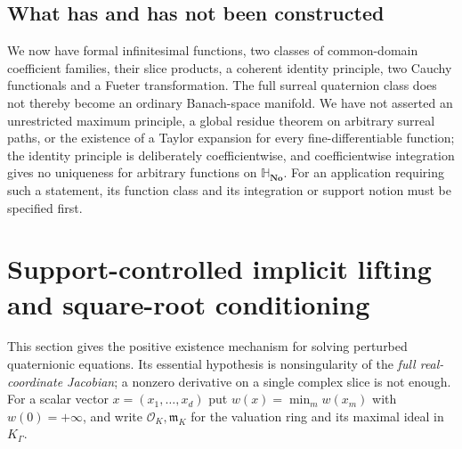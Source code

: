 \documentclass[11pt,letterpaper]{article}
\numberwithin{equation}{section}
\theoremstyle{definition}
\theoremstyle{remark}
\newcommand{\No}{\mathbf{No}}
\newcommand{\SQ}{\mathbb H_{\No}}
\newcommand{\OO}{\mathcal O}
\newcommand{\mm}{\mathfrak m}
\begin{document}
\subsection{What has and has not been constructed}\label{squat:sub:analysis-scope}
We now have formal infinitesimal functions, two classes of common-domain coefficient
families, their slice products, a coherent identity principle, two Cauchy functionals and a
Fueter transformation. The full surreal quaternion class does not thereby become an
ordinary Banach-space manifold. We have not asserted an unrestricted maximum principle, a
global residue theorem on arbitrary surreal paths, or the existence of a Taylor expansion
for every fine-differentiable function; the identity principle is deliberately
coefficientwise, and coefficientwise integration gives no uniqueness for arbitrary
functions on $\SQ$. For an application requiring such a statement, its function class and
its integration or support notion must be specified first.

\section{Support-controlled implicit lifting and square-root conditioning}\label{squat:sec:lifting}

This section gives the positive existence mechanism for solving perturbed quaternionic
equations. Its essential hypothesis is nonsingularity of the \emph{full real-coordinate
Jacobian}; a nonzero derivative on a single complex slice is not enough. For a scalar
vector $x=(x_1,\ldots,x_d)$ put $w(x)=\min_mw(x_m)$ with $w(0)=+\infty$, and write
$\OO_K,\mm_K$ for the valuation ring and its maximal ideal in $K_\Gamma$.
\end{document}
